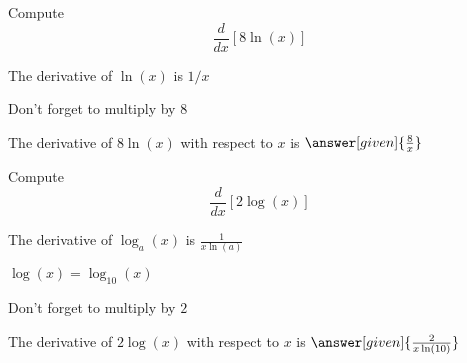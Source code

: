 \documentclass{ximera}
\begin{document}
\begin{problem} %
  Compute 
  \[
  \frac{d}{dx} \left[8\ln(x)\right]
  \]
  
    \begin{hint}
      The derivative of $\ln(x)$ is $1/x$
    \end{hint}
		\begin{hint}
		  Don't forget to multiply by $8$
		\end{hint}
		
		The derivative of $8\ln(x)$ with respect to $x$ is
		 $\answer[given]{\frac{8}{x}}$
	
\end{problem}


\begin{problem} %
  Compute 
  \[
  \frac{d}{dx} \left[2\log(x)\right]
  \]
  
    \begin{hint}
      The derivative of $\log_a(x)$ is $\frac{1}{x\ln(a)}$
    \end{hint}
		\begin{hint}
		  $\log(x) = \log_10(x)$ 
		\end{hint}
		\begin{hint}
		  Don't forget to multiply by $2$
		\end{hint}
		
		The derivative of $2\log(x)$ with respect to $x$ is
		 $\answer[given]{\frac{2}{x\ln(10)}}$
	
\end{problem}
\end{document}
